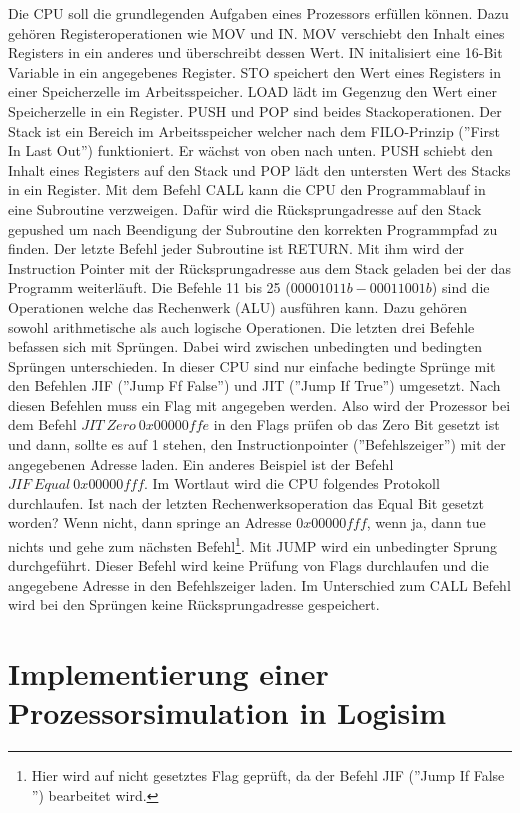 \documentclass[12pt]{article}
\begin{document}
Die CPU soll die grundlegenden Aufgaben eines Prozessors erfüllen können. Dazu gehören Registeroperationen wie MOV und IN. MOV verschiebt den Inhalt eines Registers in ein anderes und überschreibt dessen Wert. IN initalisiert eine 16-Bit Variable in ein angegebenes Register. STO speichert den Wert eines Registers in einer Speicherzelle im Arbeitsspeicher. LOAD lädt im Gegenzug den Wert einer Speicherzelle in ein Register. PUSH und POP sind beides Stackoperationen. Der Stack ist ein Bereich im Arbeitsspeicher welcher nach dem FILO-Prinzip (''First In Last Out'') funktioniert. Er wächst von oben nach unten. PUSH schiebt den Inhalt eines Registers auf den Stack und POP lädt den untersten Wert des Stacks in ein Register. Mit dem Befehl CALL kann die CPU den Programmablauf in eine Subroutine verzweigen. Dafür wird die Rücksprungadresse auf den Stack gepushed um nach Beendigung der Subroutine den korrekten Programmpfad zu finden. Der letzte Befehl jeder Subroutine ist RETURN. Mit ihm wird der Instruction Pointer mit der Rücksprungadresse aus dem Stack geladen bei der das Programm weiterläuft. Die Befehle 11 bis 25 ($00001011b - 00011001b$) sind die Operationen welche das Rechenwerk (ALU) ausführen kann. Dazu gehören sowohl arithmetische als auch logische Operationen. Die letzten drei Befehle befassen sich mit Sprüngen. Dabei wird zwischen unbedingten und bedingten Sprüngen unterschieden. In dieser CPU sind nur einfache bedingte Sprünge mit den Befehlen JIF (''Jump Ff False'') und JIT (''Jump If True'') umgesetzt. Nach diesen Befehlen muss ein Flag mit angegeben werden. Also wird der Prozessor bei dem Befehl $JIT \ Zero \ 0x00000ffe$  in den Flags prüfen ob das Zero Bit gesetzt ist und dann, sollte es auf 1 stehen, den Instructionpointer (''Befehlszeiger'') mit der angegebenen Adresse laden. Ein anderes Beispiel ist der Befehl $JIF \ Equal \ 0x00000fff$. Im Wortlaut wird die CPU folgendes Protokoll durchlaufen. Ist nach der letzten Rechenwerksoperation das Equal Bit gesetzt worden? Wenn nicht, dann springe an Adresse $0x00000fff$, wenn ja, dann tue nichts und gehe zum nächsten Befehl\footnote{Hier wird auf nicht gesetztes Flag geprüft, da der Befehl JIF (''Jump If False '') bearbeitet wird.}. Mit JUMP wird ein unbedingter Sprung durchgeführt. Dieser Befehl wird keine Prüfung von Flags durchlaufen und die angegebene Adresse in den Befehlszeiger laden. Im Unterschied zum CALL Befehl wird bei den Sprüngen keine Rücksprungadresse gespeichert.

\newpage
\section{Implementierung einer Prozessorsimulation in Logisim}
\end{document}
